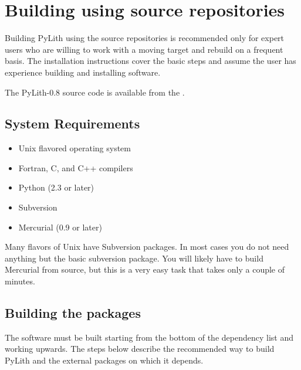 \section{Building using source repositories}

\begin{warning}
  Building PyLith using the source repositories is recommended
  only for expert users who are willing to work with a moving
  target and rebuild on a frequent basis. The installation
  instructions cover the basic steps and assume the user has
  experience building and installing software.
\end{warning}

The PyLith-0.8 source code is available from the 
.

\subsection{System Requirements}

\begin{itemize}
\item Unix flavored operating system
\item Fortran, C, and C++ compilers
\item Python (2.3 or later)
\item Subversion
\item Mercurial (0.9 or later)
\end{itemize}

\begin{tip}
  Many flavors of Unix have Subversion packages. In most
  cases you do not need anything but the basic subversion
  package. You will likely have to build Mercurial from
  source, but this is a very easy task that takes only a
  couple of minutes.
\end{tip}

\subsection{Building the packages}

The software must be built starting from the bottom of the dependency
list and working upwards. The steps below describe the recommended way
to build PyLith and the external packages on which it depends.

